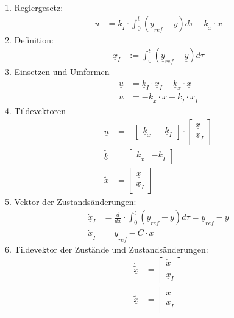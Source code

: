 \documentclass[
	pagesize,
	fontsize=12pt,
	paper=a4,
	oneside,
   reqno
]{scrartcl}
\begin{document}
1. Reglergesetz:
\begin{align*}
    \underline{u} &= \underline{k}_{I}\cdot\int_{0}^t(\underline{y}_{ref}-\underline{y})d\tau-\underline{k}_{x}\cdot\underline{x}
\end{align*}
2. Definition:
\begin{align*}
    \underline{x}_{I}& :=\int_{0}^t(\underline{y}_{ref}-\underline{y})d\tau
\end{align*}
3. Einsetzen und Umformen
\begin{align*}
    \underline{u} &= \underline{k}_{I}\cdot\underline{x}_{I}-\underline{k}_{x}\cdot\underline{x} \\
    \underline{u} &= -\underline{k}_{x}\cdot\underline{x}+\underline{k}_{I}\cdot\underline{x}_{I}
\end{align*}
4. Tildevektoren
\begin{align*}
    \underline{u} &= -
    \begin{bmatrix}
        \underline{k}_{x} & -\underline{k}_{I}
    \end{bmatrix}
    \cdot
    \begin{bmatrix}
        \underline{x} \\
        \underline{x}_{I}
    \end{bmatrix} \\
    \underline{\tilde{k}} &= 
    \begin{bmatrix}
        \underline{k}_{x} & -\underline{k}_{I}
    \end{bmatrix} \\
    \underline{\tilde{x}} &= 
    \begin{bmatrix}
        \underline{x} \\
        \underline{x}_{I}
    \end{bmatrix}
\end{align*}
5. Vektor der Zustandsänderungen:
\begin{align*}
    \underline{\dot{x}}_{I} &= \frac{d}{dx}\cdot\int_{0}^t(\underline{y}_{ref}-\underline{y})d\tau = \underline{y}_{ref}-\underline{y} \\
    \underline{\dot{x}}_{I} &= \underline{y}_{ref}-\underline{C}\cdot\underline{x}
\end{align*}
6. Tildevektor der Zustände und Zustandsänderungen: 
\begin{align*}
    \underline{\dot{\tilde{x}}} &= 
    \begin{bmatrix}
        \underline{\dot{x}} \\
        \underline{\dot{x}}_{I}
    \end{bmatrix}\\
    \underline{\tilde{x}} &=
    \begin{bmatrix}
        \underline{x} \\
        \underline{x}_{I}
    \end{bmatrix}
\end{align*}
\end{document}
